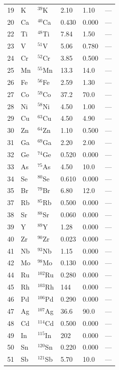 \documentclass[12pt,a4paper]{article}
\begin{document}
\begin{longtable}{p{0.8cm}p{1.2cm}p{2.0cm}p{2.5cm}p{2.5cm}p{2.5cm}}
		19 & K  & \(^{39}\)K & 2.10 & 1.10 & --- \\
		20 & Ca & \(^{40}\)Ca & 0.430 & 0.000 & --- \\
		22 & Ti & \(^{48}\)Ti & 7.84 & 1.50 & --- \\
		23 & V  & \(^{51}\)V & 5.06 & 0.780 & --- \\
		24 & Cr & \(^{52}\)Cr & 3.85 & 0.500 & --- \\
		25 & Mn & \(^{55}\)Mn & 13.3 & 14.0 & --- \\
		26 & Fe & \(^{56}\)Fe & 2.59 & 1.30 & --- \\
		27 & Co & \(^{59}\)Co & 37.2 & 70.0 & --- \\
		28 & Ni & \(^{58}\)Ni & 4.50 & 1.00 & --- \\
		29 & Cu & \(^{63}\)Cu & 4.50 & 4.90 & --- \\
		30 & Zn & \(^{64}\)Zn & 1.10 & 0.500 & --- \\
		31 & Ga & \(^{69}\)Ga & 2.20 & 2.00 & --- \\
		32 & Ge & \(^{74}\)Ge & 0.520 & 0.000 & --- \\
		33 & As & \(^{75}\)As & 4.50 & 10.0 & --- \\
		34 & Se & \(^{80}\)Se & 0.610 & 0.000 & --- \\
		35 & Br & \(^{79}\)Br & 6.80 & 12.0 & --- \\
		37 & Rb & \(^{85}\)Rb & 0.500 & 0.000 & --- \\
		38 & Sr & \(^{88}\)Sr & 0.060 & 0.000 & --- \\
		39 & Y  & \(^{89}\)Y & 1.28 & 0.000 & --- \\
		40 & Zr & \(^{90}\)Zr & 0.023 & 0.000 & --- \\
		41 & Nb & \(^{93}\)Nb & 1.15 & 0.000 & --- \\
		42 & Mo & \(^{98}\)Mo & 0.130 & 0.000 & --- \\
		44 & Ru & \(^{102}\)Ru & 0.280 & 0.000 & --- \\
		45 & Rh & \(^{103}\)Rh & 144 & 0.000 & --- \\
		46 & Pd & \(^{106}\)Pd & 0.290 & 0.000 & --- \\
		47 & Ag & \(^{107}\)Ag & 36.6 & 90.0 & --- \\
		48 & Cd & \(^{114}\)Cd & 0.500 & 0.000 & --- \\
		49 & In & \(^{115}\)In & 202 & 0.000 & --- \\
		50 & Sn & \(^{120}\)Sn & 0.220 & 0.000 & --- \\
		51 & Sb & \(^{121}\)Sb & 5.70 & 10.0 & --- \\

\end{longtable}
\end{document}
